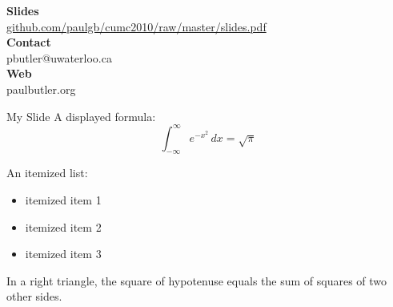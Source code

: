 \documentclass{beamer}
\theoremstyle{definition}
\theoremstyle{definition}
\begin{document}
\begin{frame}
{}

\end{frame}


\begin{frame}
\textbf{Slides} \\
\url{github.com/paulgb/cumc2010/raw/master/slides.pdf} \\
\vspace{1.5em}
\textbf{Contact} \\
pbutler@uwaterloo.ca \\
\vspace{1.5em}
\textbf{Web} \\
paulbutler.org
\end{frame}

\begin{frame}{My Slide}
A displayed formula:
\[
    \int_{-\infty}^\infty e^{-x^2} \, dx = \sqrt{\pi}
\]

An itemized list:
\begin{itemize}
    \item itemized item 1
    \item itemized item 2
    \item itemized item 3
\end{itemize}

\begin{theorem}
    In a right triangle, the square of hypotenuse equals
    the sum of squares of two other sides.
\end{theorem}

\end{frame}
\end{document}
